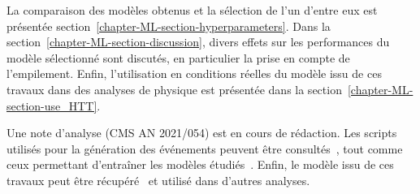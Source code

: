 La comparaison des modèles obtenus et la sélection de l'un d'entre eux est présentée section~\ref{chapter-ML-section-hyperparameters}.
Dans la section~\ref{chapter-ML-section-discussion},
divers effets sur les performances du modèle sélectionné sont discutés,
en particulier la prise en compte de l'empilement.
Enfin, l'utilisation en conditions réelles du modèle issu de ces travaux dans des analyses de physique est présentée dans la section~\ref{chapter-ML-section-use_HTT}.
\par
Une note d'analyse (CMS AN 2021/054) \cite{CMS-NOTE-2021-054} est en cours de rédaction.
Les scripts utilisés pour la génération des événements peuvent être consultés~\cite{fastsim_ece},
tout comme ceux permettant d'entraîner les modèles étudiés~\cite{DL_for_HTT_mass}.
Enfin, le modèle issu de ces travaux peut être récupéré~\cite{DiTau_ML_mass} et utilisé dans d'autres analyses.